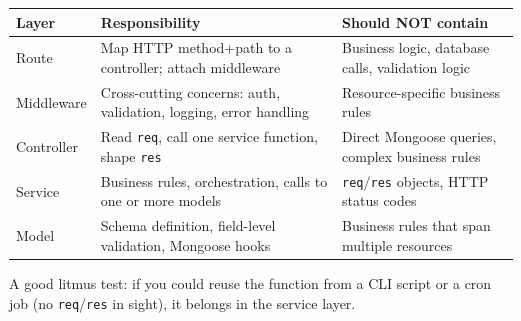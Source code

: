 \begin{table}[h]
\centering
\begin{tabularx}{\textwidth}{l X X}
\toprule
\textbf{Layer} & \textbf{Responsibility} & \textbf{Should NOT contain} \\
\midrule
Route       & Map HTTP method+path to a controller; attach middleware & Business logic, database calls, validation logic \\
Middleware  & Cross-cutting concerns: auth, validation, logging, error handling & Resource-specific business rules \\
Controller  & Read \texttt{req}, call one service function, shape \texttt{res} & Direct Mongoose queries, complex business rules \\
Service     & Business rules, orchestration, calls to one or more models & \texttt{req}/\texttt{res} objects, HTTP status codes \\
Model       & Schema definition, field-level validation, Mongoose hooks & Business rules that span multiple resources \\
\bottomrule
\end{tabularx}
\end{table}

\begin{tipbox}[TIP]
A good litmus test: if you could reuse the function from a CLI script or a cron job (no \texttt{req}/\texttt{res} in sight), it belongs in the service layer.
\end{tipbox}
